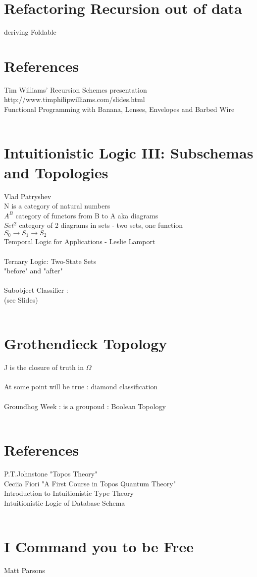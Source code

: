 \documentclass{article}
\begin{document}
\section{Refactoring Recursion out of data}
deriving Foldable
\\
\section{References}
Tim Williams' Recursion Schemes presentation
\\
http://www.timphilipwilliams.com/slides.html
\\
Functional Programming with Banana, Lenses, Envelopes and Barbed Wire
\\
\\
\section{Intuitionistic Logic III: Subschemas and Topologies}
Vlad Patryshev
\\
N is a category of natural numbers
\\
$A^{B}$ category of functors from B to A aka diagrams
\\
$Set^{2}$ category of 2 diagrams in sets - two sets, one function
\\
$S_{0} \rightarrow S_{1} \rightarrow S_{2}$
\\
Temporal Logic for Applications - Leslie Lamport
\\
\\
Ternary Logic: Two-State Sets
\\
"before" and "after"
\\
\\
Subobject Classifier :
\\
(see Slides)
\\
\\
\section{Grothendieck Topology}
J is the closure of truth in $\Omega$
\\
\\
At some point will be true : diamond classification
\\
\\
Groundhog Week : is a groupoud : Boolean Topology
\\
\\
\section{References}
P.T.Johnstone "Topos Theory"
\\
Ceciia Fiori "A First Course in Topos Quantum Theory"
\\
Introduction to Intuitionistic Type Theory
\\
Intuitionistic Logic of Database Schema
\\
\\
\section{I Command you to be Free}
Matt Parsons
\\
\\
\end{document}
